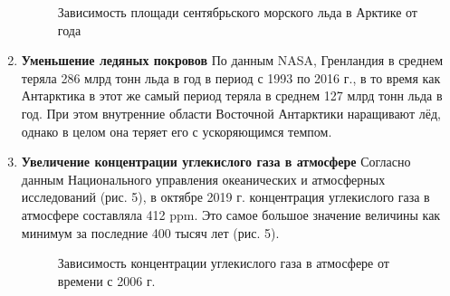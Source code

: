 \documentclass[a4paper,14pt]{article}
\begin{document}
\begin{enumerate}
\begin{figure}[h!]
\caption{Зависимость площади сентябрьского морского льда в Арктике от года}
\end{figure}

\item \textbf{Уменьшение ледяных покровов}
\newline
По данным NASA, Гренландия в среднем теряла 286 млрд тонн льда в год в период с 1993 по 2016 г., в то время как Антарктика в этот же самый период теряла в среднем 127 млрд тонн льда в год. При этом внутренние области Восточной Антарктики наращивают лёд, однако в целом она теряет его с ускоряющимся темпом.

\item \textbf{Увеличение концентрации углекислого газа в атмосфере}
Согласно данным Национального управления океанических и атмосферных исследований (рис. 5), в октябре 2019 г. концентрация углекислого газа в атмосфере составляла 412 ppm. Это самое большое значение величины как минимум за последние 400 тысяч лет (рис. 5).

\begin{figure}[h!]
\caption{Зависимость концентрации углекислого газа в атмосфере от времени с 2006 г.}
\end{figure}


\end{enumerate}
\end{document}
